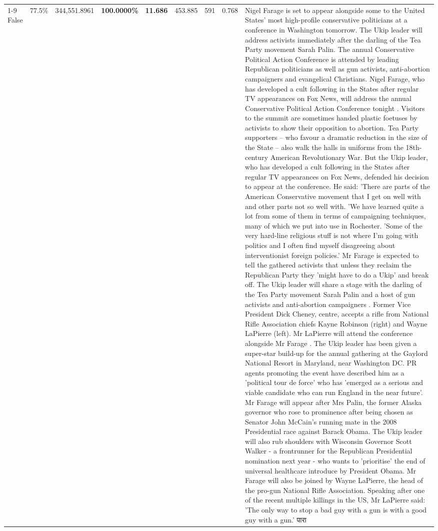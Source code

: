\begin{table}[H]
\begin{tabular}{lllrlllll}
\cline{1-9}
False & 77.5\% & 344,551.8961 & \bfseries \color{red} 100.0000\% & \bfseries \color{red} 11.686 & 453.885 & 591 & 0.768 & Nigel Farage is set to appear alongside some to the United States' most high-profile conservative politicians at a conference in Washington tomorrow. The Ukip leader will address activists immediately after the darling of the Tea Party movement Sarah Palin. The annual Conservative Political Action Conference is attended by leading Republican politicians as well as gun activists, anti-abortion campaigners and evangelical Christians. Nigel Farage, who has developed a cult following in the States after regular TV appearances on Fox News, will address the annual Conservative Political Action Conference tonight . Visitors to the summit are sometimes handed plastic foetuses by activists to show their opposition to abortion. Tea Party supporters – who favour a dramatic reduction in the size of the State – also walk the halls in uniforms from the 18th-century American Revolutionary War. But the Ukip leader, who has developed a cult following in the States after regular TV appearances on Fox News, defended his decision to appear at the conference. He said: 'There are parts of the American Conservative movement that I get on well with and other parts not so well with. 'We have learned quite a lot from some of them in terms of campaigning techniques, many of which we put into use in Rochester. 'Some of the very hard-line religious stuff is not where I'm going with politics and I often find myself disagreeing about interventionist foreign policies.' Mr Farage is expected to tell the gathered activists that unless they reclaim the Republican Party they 'might have to do a Ukip' and break off. The Ukip leader will share a stage with the darling of the Tea Party movement Sarah Palin and a host of gun activists and anti-abortion campaigners . Former Vice President Dick Cheney, centre, accepts a rifle from National Rifle Association chiefs Kayne Robinson (right) and Wayne LaPierre (left). Mr LaPierre will attend the conference alongside Mr Farage . The Ukip leader has been given a super-star build-up for the annual gathering at the Gaylord National Resort in Maryland, near Washington DC. PR agents promoting the event have described him as a 'political tour de force' who has 'emerged as a serious and viable candidate who can run England in the near future'. Mr Farage will appear after Mrs Palin, the former Alaska governor who rose to prominence after being chosen as Senator John McCain's running mate in the 2008 Presidential race against Barack Obama. The Ukip leader will also rub shoulders with Wisconsin Governor Scott Walker - a frontrunner for the Republican Presidential nomination next year - who wants to 'prioritise' the end of universal healthcare introduce by President Obama. Mr Farage will also be joined by Wayne LaPierre, the head of the pro-gun National Rifle Association. Speaking after one of the recent multiple killings in the US, Mr LaPierre said: 'The only way to stop a bad guy with a gun is with a good guy with a gun.' पारा \\

\end{tabular}
\end{table}
